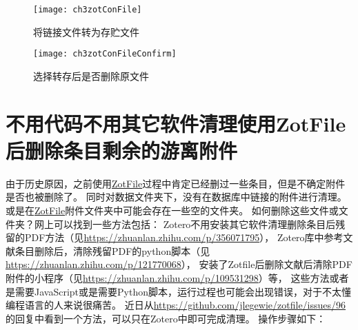 \documentclass[cn,11pt,chinese]{elegantbook}
\begin{document}
	\begin{figure}[htbp]
		\centering
		\texttt{[image: ch3zotConFile]}
		\caption{将链接文件转为存贮文件}
		\label{fig:ch3zotConFile}
	\end{figure}

	\begin{figure}[htbp]
		\centering
		\texttt{[image: ch3zotConFileConfirm]}
		\caption{选择转存后是否删除原文件}
		\label{fig:ch3zotConFileConfirm}
	\end{figure}

\section{不用代码不用其它软件清理使用ZotFile后删除条目剩余的游离附件}\label{sec:zotFile_clean_att}

由于历史原因，之前使用\href{http://zotfile.com/}{ZotFile}过程中肯定已经删过一些条目，但是不确定附件是否也被删除了。
同时对数据文件夹下，没有在数据库中链接的附件进行清理。或是在\href{http://zotfile.com/}{ZotFile}附件文件夹中可能会存在一些空的文件夹。
如何删除这些文件或文件夹？网上可以找到一些方法包括：
Zotero不用安装其它软件清理删除条目后残留的PDF方法（见\url{https://zhuanlan.zhihu.com/p/356071795}），
Zotero库中参考文献条目删除后，清除残留PDF的python脚本（见\url{https://zhuanlan.zhihu.com/p/121770068}），
安装了Zotfile后删除文献后清除PDF附件的小程序（见\url{https://zhuanlan.zhihu.com/p/109531298}）等，
这些方法或者是需要JavaScript或是需要Python脚本，运行过程也可能会出现错误，对于不太懂编程语言的人来说很痛苦。
近日从\url{https://github.com/jlegewie/zotfile/issues/96}的回复中看到一个方法，可以只在Zotero中即可完成清理。
操作步骤如下：
\end{document}
